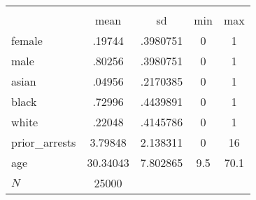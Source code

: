 {
\def\sym#1{\ifmmode^{#1}\else\(^{#1}\)\fi}
\begin{tabular}{l*{1}{cccc}}
\toprule
            &\multicolumn{4}{c}{}                               \\
            &        mean&          sd&         min&         max\\
\midrule
female      &      .19744&    .3980751&           0&           1\\
male        &      .80256&    .3980751&           0&           1\\
asian       &      .04956&    .2170385&           0&           1\\
black       &      .72996&    .4439891&           0&           1\\
white       &      .22048&    .4145786&           0&           1\\
prior\_arrests&     3.79848&    2.138311&           0&          16\\
age         &    30.34043&    7.802865&         9.5&        70.1\\
\midrule
\(N\)       &       25000&            &            &            \\
\bottomrule
\end{tabular}
}
